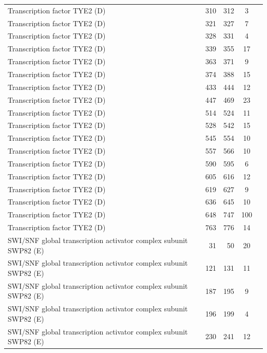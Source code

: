 \begin{longtable}{@{}p{7.5cm}rrrl@{}}
  Transcription factor TYE2 (D) & 310 & 312 & \multicolumn{1}{c}{3} \\
  Transcription factor TYE2 (D) & 321 & 327 & \multicolumn{1}{c}{7} \\
  Transcription factor TYE2 (D) & 328 & 331 & \multicolumn{1}{c}{4} \\
  Transcription factor TYE2 (D) & 339 & 355 & \multicolumn{1}{c}{17} \\
  Transcription factor TYE2 (D) & 363 & 371 & \multicolumn{1}{c}{9} \\
  Transcription factor TYE2 (D) & 374 & 388 & \multicolumn{1}{c}{15} \\
  Transcription factor TYE2 (D) & 433 & 444 & \multicolumn{1}{c}{12} \\
  Transcription factor TYE2 (D) & 447 & 469 & \multicolumn{1}{c}{23} \\
  Transcription factor TYE2 (D) & 514 & 524 & \multicolumn{1}{c}{11} \\
  Transcription factor TYE2 (D) & 528 & 542 & \multicolumn{1}{c}{15} \\
  Transcription factor TYE2 (D) & 545 & 554 & \multicolumn{1}{c}{10} \\
  Transcription factor TYE2 (D) & 557 & 566 & \multicolumn{1}{c}{10} \\
  Transcription factor TYE2 (D) & 590 & 595 & \multicolumn{1}{c}{6} \\
  Transcription factor TYE2 (D) & 605 & 616 & \multicolumn{1}{c}{12} \\
  Transcription factor TYE2 (D) & 619 & 627 & \multicolumn{1}{c}{9} \\
  Transcription factor TYE2 (D) & 636 & 645 & \multicolumn{1}{c}{10} \\
  Transcription factor TYE2 (D) & 648 & 747 & \multicolumn{1}{c}{100} \\
  Transcription factor TYE2 (D) & 763 & 776 & \multicolumn{1}{c}{14} \\
  SWI/SNF global transcription activator complex subunit SWP82 (E) & 31 & 50 & \multicolumn{1}{c}{20} \\
  SWI/SNF global transcription activator complex subunit SWP82 (E) & 121 & 131 & \multicolumn{1}{c}{11} \\
  SWI/SNF global transcription activator complex subunit SWP82 (E) & 187 & 195 & \multicolumn{1}{c}{9} \\
  SWI/SNF global transcription activator complex subunit SWP82 (E) & 196 & 199 & \multicolumn{1}{c}{4} \\
  SWI/SNF global transcription activator complex subunit SWP82 (E) & 230 & 241 & \multicolumn{1}{c}{12} \\

\end{longtable}
